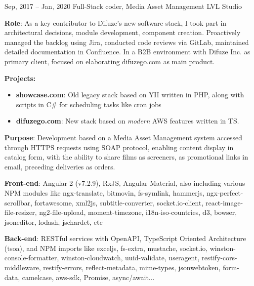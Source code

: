 \documentclass[
  a4paper,
   maincolor=cvblue,
   sectioncolor=cvblue,
   sidebarwidth=0.323\paperwidth,
]{fortysecondscv}
\begin{document}
\begin{cvtableNew}
  \vspace{1.6mm}



  \cvitemRightNew
    {Sep, 2017 – Jan, 2020} %
    {Full-Stack coder, Media Asset Management} %
    {LVL Studio} %
      {
        \vspace{0.2pt} %
        \fontsize{10.8pt}{12pt}\selectfont %
        \textbf{Role}: As a key contributor to Difuze’s new software stack, I took part in architectural decisions,
        module development, component creation. Proactively managed the backlog using Jira, conducted code reviews via GitLab, maintained detailed documentation in Confluence. In a B2B environment with Difuze Inc. as primary client, focused on elaborating difuzego.com as main product.\vspace{5pt}

        \vspace{0.1pt} %
        \textbf{Projects:}
        \begin{itemize}[itemsep=1mm, topsep=5pt, leftmargin=8pt]
          \item \textbf{showcase.com}: Old legacy stack based on YII written in PHP, along with scripts in C\# for scheduling tasks like cron jobs
          \item \textbf{difuzego.com}: New stack based on \textit{modern} AWS features written in TS.
        \end{itemize}

        \vspace{4pt} %
        \textbf{Purpose}: Development based on a Media Asset Management system accessed through HTTPS requests using SOAP protocol, enabling content display in catalog form, with the ability to share films as screeners, as promotional links in email, preceding deliveries as orders.\vspace{5pt}

        \textbf{Front-end}: Angular 2 (v7.2.9), RxJS, Angular Material, also including various NPM modules like ngx-translate, bitmovin, fs-symlink, hammerjs, ngx-perfect-scrollbar, fortawesome, xml2js, subtitle-converter, socket.io-client, react-image-file-resizer, ng2-file-upload, moment-timezone, i18n-iso-countries, d3, bowser, jsoneditor, lodash, jschardet, etc\vspace{5pt}

        \textbf{Back-end}: RESTful services with OpenAPI, TypeScript Oriented Architecture (tsoa), and NPM imports like exceljs, fs-extra, mustache, socket.io, winston-console-formatter, winston-cloudwatch, uuid-validate, useragent, restify-cors-middleware, restify-errors, reflect-metadata, mime-types, jsonwebtoken, form-data, camelcase, aws-sdk, Promise, async/await...\vspace{5pt}

}
\end{cvtableNew}
\end{document}

